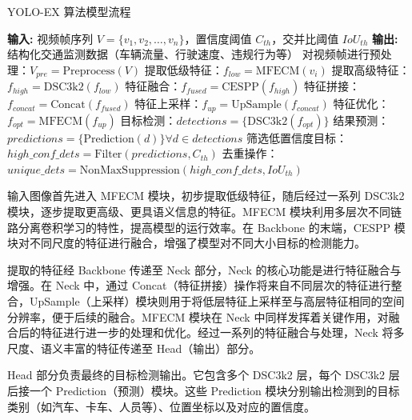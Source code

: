 \documentclass[runningheads]{llncs}
\begin{document}
\begin{algorithm}[htbp]
    \caption{YOLO-EX 算法模型流程}
    \label{alg:yoloex}
    \begin{algorithmic}%
        \State \textbf{输入:} 视频帧序列 $V = \{v_1, v_2, \dots, v_n\}$，置信度阈值 $C_{th}$，交并比阈值 $IoU_{th}$
        \State \textbf{输出:} 结构化交通监测数据（车辆流量、行驶速度、违规行为等）
        \State 对视频帧进行预处理：$V_{pre} = \text{Preprocess}(V)$
            \State 提取低级特征：$f_{low} = \text{MFECM}(v_i)$
            \State 提取高级特征：$f_{high} = \text{DSC3k2}(f_{low})$
            \State 特征融合：$f_{fused} = \text{CESPP}(f_{high})$
            \State 特征拼接：$f_{concat} = \text{Concat}(f_{fused})$
            \State 特征上采样：$f_{up} = \text{UpSample}(f_{concat})$
            \State 特征优化：$f_{opt} = \text{MFECM}(f_{up})$
            \State 目标检测：$detections = \{\text{DSC3k2}(f_{opt})\}$
            \State 结果预测：$predictions = \{\text{Prediction}(d)\} \forall d \in detections$
        \EndFor
        \State 筛选低置信度目标：$high\_conf\_dets = \text{Filter}(predictions, C_{th})$
        \State 去重操作：$unique\_dets = \text{NonMaxSuppression}(high\_conf\_dets, IoU_{th})$
    \end{algorithmic}
    \end{algorithm}

输入图像首先进入 MFECM 模块，初步提取低级特征，随后经过一系列 DSC3k2 模块，逐步提取更高级、更具语义信息的特征。MFECM 模块利用多层次不同链路分离卷积学习的特性，提高模型的运行效率。在 Backbone 的末端，CESPP 模块对不同尺度的特征进行融合，增强了模型对不同大小目标的检测能力。

提取的特征经 Backbone 传递至 Neck 部分，Neck 的核心功能是进行特征融合与增强。在 Neck 中，通过 Concat（特征拼接）操作将来自不同层次的特征进行整合，UpSample（上采样）模块则用于将低层特征上采样至与高层特征相同的空间分辨率，便于后续的融合。MFECM 模块在 Neck 中同样发挥着关键作用，对融合后的特征进行进一步的处理和优化。经过一系列的特征融合与处理，Neck 将多尺度、语义丰富的特征传递至 Head（输出）部分。

Head 部分负责最终的目标检测输出。它包含多个 DSC3k2 层，每个 DSC3k2 层后接一个 Prediction（预测）模块。这些 Prediction 模块分别输出检测到的目标类别（如汽车、卡车、人员等）、位置坐标以及对应的置信度。
\end{document}
